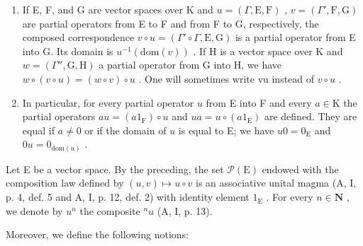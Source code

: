 \begin{enumerate}
\def\labelenumi{(\roman{enumi})}
\setcounter{enumi}{1}
\item
  If E, F, and G are vector spaces over K and \(u = (\Gamma, \mathrm{E}, \mathrm{F})\) , \(v = (\Gamma', \mathrm{F}, \mathrm{G})\) are partial operators from E to F and from F to G, respectively, the composed correspondence \(v \circ u = (\Gamma' \circ \Gamma, \mathrm{E}, \mathrm{G})\) is a partial operator from E into G. Its domain is \(u^{-1}(\mathrm{dom}(v))\) . If H is a vector space over K and \(w = (\Gamma'', \mathrm{G}, \mathrm{H})\) a partial operator from G into H, we have \(w \circ (v \circ u) = (w \circ v) \circ u\) . One will sometimes write vu instead of \(v \circ u\) .
\item
  In particular, for every partial operator \(u\) from E into F and every \(a \in \mathrm{K}\) the partial operators \(au = (a1_{\mathrm{F}}) \circ u\) and \(ua = u \circ (a1_{\mathrm{E}})\) are defined. They are equal if \(a \neq 0\) or if the domain of \(u\) is equal to E; we have \(u0 = 0_{\mathrm{E}}\) and \(0u = 0_{\mathrm{dom}(u)}\) .
\end{enumerate}

Let E be a vector space. By the preceding, the set \(\mathcal{P}(\mathrm{E})\) endowed with the composition law defined by \((u,v)\mapsto u\circ v\) is an associative unital magma (A, I, p. 4, def. 5 and A, I, p. 12, def. 2) with identity element \(1_{\mathrm{E}}\) . For every \(n\in \mathbf{N}\) , we denote by \(u^n\) the composite \({}^n u\) (A, I, p. 13).

Moreover, we define the following notions:


